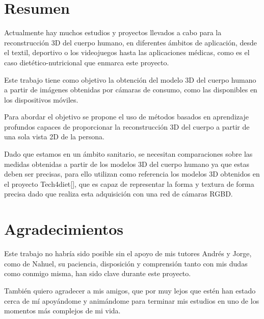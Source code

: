 
\chapter*{Resumen}
\thispagestyle{empty}


Actualmente hay muchos estudios y proyectos llevados a cabo para la reconstrucción  3D del cuerpo humano, en diferentes ámbitos de aplicación, desde el textil, deportivo o los videojuegos hasta las aplicaciones médicas, como es el caso dietético-nutricional que enmarca este proyecto.

Este trabajo tiene como objetivo la obtención del modelo 3D del cuerpo humano a partir de imágenes obtenidas por cámaras de consumo, como las disponibles en los dispositivos móviles. 

Para abordar el objetivo se propone el uso de métodos basados en aprendizaje profundos capaces de proporcionar la reconstrucción 3D del cuerpo a partir de una sola vista 2D de la persona.

Dado que estamos en un ámbito sanitario, se necesitan comparaciones sobre las medidas obtenidas a partir de los modelos 3D del cuerpo humano ya que estas deben ser precisas, para ello utilizan como referencia los modelos 3D obtenidos en el proyecto Tech4diet[\cite{tech}], que es capaz de representar la forma y textura de forma precisa dado que realiza esta adquisición con una red de cámaras RGBD. 

\cleardoublepage %
\chapter*{Agradecimientos
}

\thispagestyle{empty}
\vspace{1cm}

Este trabajo no habría sido posible sin el apoyo de mis tutores Andrés y Jorge, como de Nahuel, su paciencia, disposición y comprensión tanto con mis dudas como conmigo misma, han sido clave durante este proyecto.

También quiero agradecer a mis amigos, que por muy lejos que estén han estado cerca de mí apoyándome y animándome para terminar mis estudios en uno de los momentos más complejos de mi vida.

